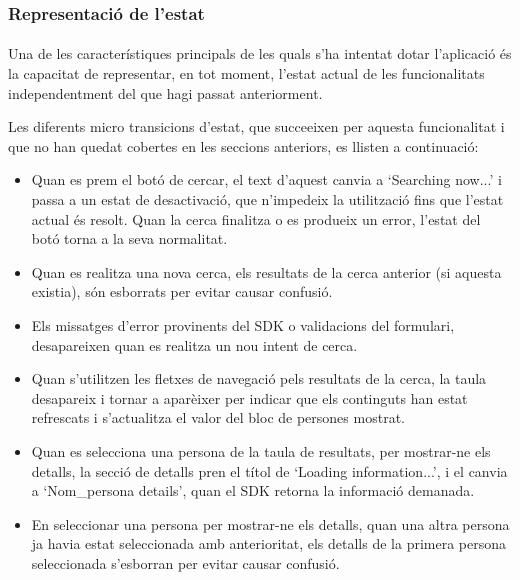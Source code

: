 \subsubsection{Representació de l'estat}

\paragraph{}
Una de les característiques principals de les quals s'ha intentat dotar l'aplicació és la capacitat de representar, en tot moment, l'estat actual de les funcionalitats independentment del que hagi passat anteriorment.

Les diferents micro transicions d'estat, que succeeixen per aquesta funcionalitat i que no han quedat cobertes en les seccions anteriors, es llisten a continuació:

\begin{itemize}
    \item Quan es prem el botó de cercar, el text d'aquest canvia a `Searching now...' i passa a un estat de desactivació, que n'impedeix la utilització fins que l'estat actual és resolt. Quan la cerca finalitza o es produeix un error, l'estat del botó torna a la seva normalitat.
    \item Quan es realitza una nova cerca, els resultats de la cerca anterior (si aquesta existia), són esborrats per evitar causar confusió.
    \item Els missatges d'error provinents del SDK o validacions del formulari, desapareixen quan es realitza un nou intent de cerca.
    \item Quan s'utilitzen les fletxes de navegació pels resultats de la cerca, la taula desapareix i tornar a aparèixer per indicar que els continguts han estat refrescats i s'actualitza el valor del bloc de persones mostrat.
    \item Quan es selecciona una persona de la taula de resultats, per mostrar-ne els detalls, la secció de detalls pren el títol de `Loading information...', i el canvia a `Nom\_persona details', quan el SDK retorna la informació demanada.
    \item En seleccionar una persona per mostrar-ne els detalls, quan una altra persona ja havia estat seleccionada amb anterioritat, els detalls de la primera persona seleccionada s’esborran per evitar causar confusió.
\end{itemize}
